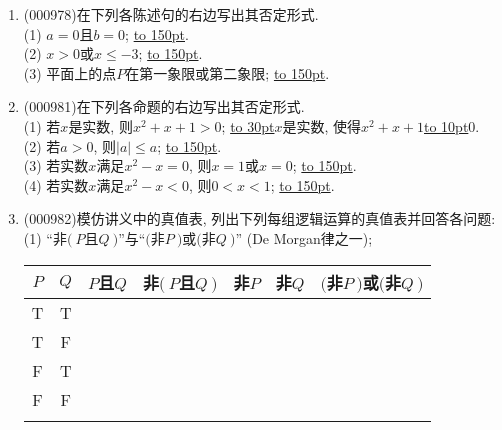 \documentclass[10pt,a4paper]{article}
\newcommand{\blank}[1]{\underline{\hbox to #1pt{}}}
\begin{document}
\begin{enumerate}[1.]
\blank{30}(2) 对一切实数$x$, $x^2+1 \ne 0$; / 存在实数$x$, 使得$x^2+1=0$.\\ 
\blank{30}(3) 所有一元二次方程都没有实数根; / 有些一元二次方程没有实数根.\\ 
\blank{30}(4) 所有自然数都不是$0$; / 所有自然数都是$0$.\\ 
\blank{30}(5) 存在实数$x$, 使得$x^2-5x+6=0$; / 所有实数$x$, 都使得$x^2-5x+6\ne 0$.\\ 
\blank{30}(6) 对于一些实数$x$, $x^3+1=0$; / 对于一些实数$x$, $x^3+1\ne 0$.\\ 
\blank{30}(7) 有些三角形两边的平方和等于第三边的平方; / 所有三角形两边的平方和不等于第三边的平方.\\ 
\blank{30}(8) 对于某些实数$x$, $x=x+1$; / 对于任意实数$x$, $x \ne x+1$.\\ 
\blank{30}(9) 负实数没有平方根; / 负实数有平方根.
\item {\tiny (000978)}在下列各陈述句的右边写出其否定形式.\\ 
(1) $a=0$且$b=0$; \blank{150}.\\ 
(2) $x>0$或$x \le -3$; \blank{150}.\\ 
(3) 平面上的点$P$在第一象限或第二象限; \blank{150}.
\item {\tiny (000981)}在下列各命题的右边写出其否定形式.\\ 
(1) 若$x$是实数, 则$x^2+x+1>0$; \blank{30}$x$是实数, 使得$x^2+x+1$\blank{10}$0$.\\ 
(2) 若$a>0$, 则$|a|\le a$; \blank{150}.\\ 
(3) 若实数$x$满足$x^2-x=0$, 则$x=1$或$x=0$; \blank{150}.\\ 
(4) 若实数$x$满足$x^2-x<0$, 则$0<x<1$; \blank{150}.
\item {\tiny (000982)}模仿讲义中的真值表, 列出下列每组逻辑运算的真值表并回答各问题:\\ 
(1) ``非$(\ P$且$Q\ )$''与``$($非$P\ )$或$($非$Q\ )$'' (De Morgan律之一);
\begin{center}
\begin{tabular}{|c|c||c|c||c|c|c||}
\hline
$P$ & $Q$ & $P$且$Q$ & 非$(\ P$且$Q\ )$ & 非$P$ & 非$Q$ & $($非$P\ )$或$($非$Q\ )$\\
\hline
T & T &&&&&\\
\hline
T & F &&&&&\\
\hline
F & T &&&&&\\
\hline
F & F &&&&&\\
\hline\\ 
\end{tabular}
\end{center} 

\end{enumerate}
\end{document}
